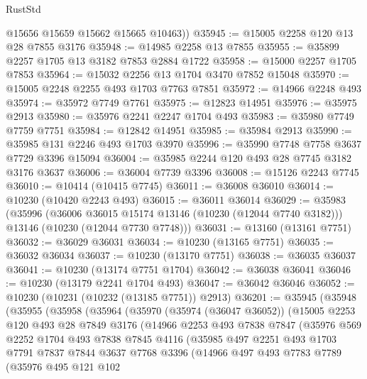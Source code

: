\begin{lexlean}{RustStd}
\begin{coremodule}
        @15656
        @15659
        @15662
        @15665
        @10463))
@35945 := @15005 @2258 @120 @13 @28 @7855 @3176
@35948 := @14985 @2258 @13 @7855
@35955 := @35899 @2257 @1705 @13 @3182 @7853 @2884 @1722
@35958 := @15000 @2257 @1705 @7853
@35964 := @15032 @2256 @13 @1704 @3470 @7852 @15048
@35970 := @15005 @2248 @2255 @493 @1703 @7763 @7851
@35972 := @14966 @2248 @493
@35974 := @35972 @7749 @7761
@35975 := @12823 @14951
@35976 := @35975 @2913
@35980 := @35976 @2241 @2247 @1704 @493
@35983 := @35980 @7749 @7759 @7751
@35984 := @12842 @14951
@35985 := @35984 @2913
@35990 := @35985 @131 @2246 @493 @1703 @3970
@35996 := @35990 @7748 @7758 @3637 @7729 @3396 @15094
@36004 := @35985 @2244 @120 @493 @28 @7745 @3182 @3176 @3637
@36006 := @36004 @7739 @3396
@36008 := @15126 @2243 @7745
@36010 := @10414 (@10415 @7745)
@36011 := @36008 @36010
@36014 := @10230 (@10420 @2243 @493)
@36015 := @36011 @36014
@36029 := @35983
    (@35996
      (@36006 @36015 @15174 @13146 (@10230 (@12044 @7740 @3182)))
      @13146
      (@10230 (@12044 @7730 @7748)))
@36031 := @13160 (@13161 @7751)
@36032 := @36029 @36031
@36034 := @10230 (@13165 @7751)
@36035 := @36032 @36034
@36037 := @10230 (@13170 @7751)
@36038 := @36035 @36037
@36041 := @10230 (@13174 @7751 @1704)
@36042 := @36038 @36041
@36046 := @10230 (@13179 @2241 @1704 @493)
@36047 := @36042 @36046
@36052 := @10230 (@10231 (@10232 (@13185 @7751)) @2913)
@36201 := @35945
    (@35948
      (@35955
        (@35958
          (@35964
            (@35970
              (@35974 (@36047 @36052))
              (@15005
                @2253
                @120
                @493
                @28
                @7849
                @3176
                (@14966
                  @2253
                  @493
                  @7838
                  @7847
                  (@35976
                    @569
                    @2252
                    @1704
                    @493
                    @7838
                    @7845
                    @4116
                    (@35985
                      @497
                      @2251
                      @493
                      @1703
                      @7791
                      @7837
                      @7844
                      @3637
                      @7768
                      @3396
                      (@14966
                        @497
                        @493
                        @7783
                        @7789
                        (@35976
                          @495
                          @121
                          @102

\end{coremodule}
\end{lexlean}
